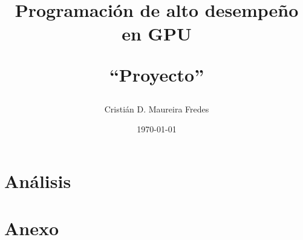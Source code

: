 \documentclass[letter, 10pt]{article}
\begin{document}

\pagestyle{empty}

\title{Programación de alto desempeño en GPU\\ \begin{Large}``Proyecto''\end{Large}}
\author{Cristián D. Maureira Fredes}
\date{\today}
\maketitle

\section{Análisis}
\label{sec:analisis}

\newpage

\section{Anexo}
\label{sec:anexo}

\end{document}
